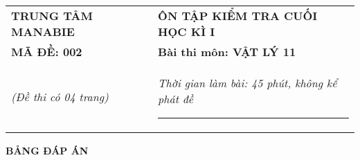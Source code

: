\begin{center}
	\begin{tabular}{M{9.25cm}M{8.75cm}}
		\textbf{TRUNG TÂM MANABIE}& \textbf{ÔN TẬP KIỂM TRA CUỐI HỌC KÌ I}\\
		\textbf{MÃ ĐỀ: 002}& \textbf{Bài thi môn: VẬT LÝ 11}\\
		\textit{(Đề thi có 04 trang)}& \textit{Thời gian làm bài: 45 phút, không kể phát đề}
		
		\noindent\rule{4cm}{0.8pt} \\
	\end{tabular}
\end{center}
\setcounter{section}{0}
\begin{center}
	\textbf{\large BẢNG ĐÁP ÁN}
\end{center}
\section{}
\section{}
\section{}
